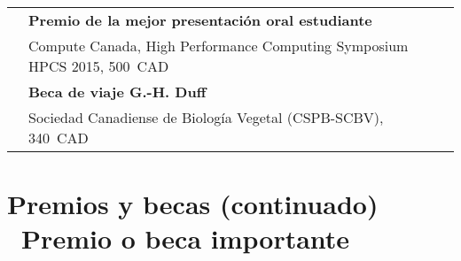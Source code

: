 \documentclass[letterpaper,12pt]{article}
\begin{document}
\begin{tabularx}{\textwidth}{@{}r|X@{}}
& \textbf{Premio de la mejor presentación oral estudiante} \\
& Compute Canada, High Performance Computing Symposium HPCS 2015, 500~CAD
  \vspace{1.3mm} \\

& \textbf{Beca de viaje G.-H. Duff} \\
& Sociedad Canadiense de Biología Vegetal (CSPB-SCBV), 340~CAD \\

\end{tabularx}

\section*{Premios y becas \small{(continuado)}
          \hfill \small{{\mdseries\faStar}~Premio o beca importante}}
\end{document}
